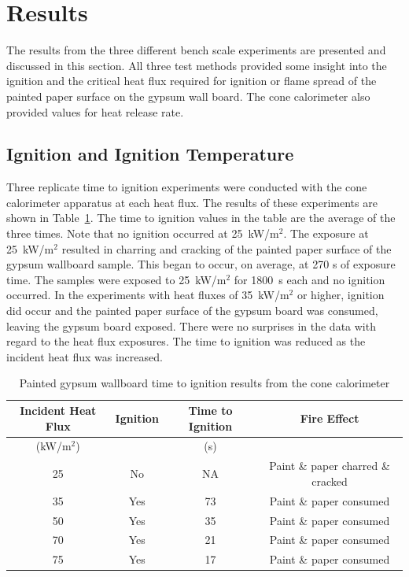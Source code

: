 \documentclass[twoside]{uocthesis}
\begin{document}
\section{Results}

The results from the three different bench scale experiments are presented and discussed in this section.  All three test methods provided some insight into the ignition and the critical heat flux required for ignition or flame spread of the painted paper surface on the gypsum wall board.  The cone calorimeter also provided values for heat release rate.   

\subsection{Ignition and Ignition Temperature}

Three replicate time to ignition experiments were conducted with the cone calorimeter apparatus at each heat flux.  The results of these experiments are shown in Table~\ref{tab:Gypsum_wallboard_timetoign}.  The time to ignition values in the table are the average of the three times.  Note that no ignition occurred at 25~kW/m$^2$.  The exposure at 25~kW/m$^2$ resulted in charring and cracking of the painted paper surface of the gypsum wallboard sample.  This began to occur, on average, at 270 s of exposure time. The samples were exposed to 25~kW/m$^2$ for 1800~s each and no ignition occurred.  In the experiments with heat fluxes of 35~kW/m$^2$ or higher, ignition did occur and the painted paper surface of the gypsum board was consumed, leaving the gypsum board exposed.  There were no surprises in the data with regard to the heat flux exposures.  The time to ignition was reduced as the incident heat flux was increased.   


\begin{table}
	\centering
	\begin{tabular}{|c|c|c|c|}
		\hline Incident Heat Flux & Ignition & Time to Ignition &  Fire Effect  \\
		\hline (kW/m$^2$) &  & (s)  &   \\
		\hline 25	& No 	& NA 		& Paint \& paper charred \& cracked \\
		\hline 35 	& Yes 	& 73	 	& Paint \& paper consumed \\
		\hline 50	& Yes 	& 35 	 	& Paint \& paper consumed   \\
		\hline 70	& Yes 	& 21 	 	& Paint \& paper consumed \\
		\hline 75	& Yes 	& 17 		& Paint \& paper consumed \\
		\hline
	\end{tabular}
	\caption[Painted gypsum wallboard time to ignition results]{Painted gypsum wallboard time to ignition results from the cone calorimeter}
	\label{tab:Gypsum_wallboard_timetoign}
\end{table}
\end{document}
